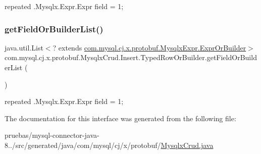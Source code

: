 {\ttfamily repeated .Mysqlx.\+Expr.\+Expr field = 1;} \mbox{\label{interfacecom_1_1mysql_1_1cj_1_1x_1_1protobuf_1_1_mysqlx_crud_1_1_insert_1_1_typed_row_or_builder_a0d0b9398d7b4753031f6af74f37e22d6}} 
\subsubsection{\texorpdfstring{get\+Field\+Or\+Builder\+List()}{getFieldOrBuilderList()}}
{\footnotesize\ttfamily java.\+util.\+List$<$? extends \mbox{\hyperlink{interfacecom_1_1mysql_1_1cj_1_1x_1_1protobuf_1_1_mysqlx_expr_1_1_expr_or_builder}{com.\+mysql.\+cj.\+x.\+protobuf.\+Mysqlx\+Expr.\+Expr\+Or\+Builder}}$>$ com.\+mysql.\+cj.\+x.\+protobuf.\+Mysqlx\+Crud.\+Insert.\+Typed\+Row\+Or\+Builder.\+get\+Field\+Or\+Builder\+List (\begin{DoxyParamCaption}{ }\end{DoxyParamCaption})}

{\ttfamily repeated .Mysqlx.\+Expr.\+Expr field = 1;} 

The documentation for this interface was generated from the following file\+:\begin{DoxyCompactItemize}
\item 
pruebas/mysql-\/connector-\/java-\/8../src/generated/java/com/mysql/cj/x/protobuf/\mbox{\hyperlink{_mysqlx_crud_8java}{Mysqlx\+Crud.\+java}}\end{DoxyCompactItemize}
